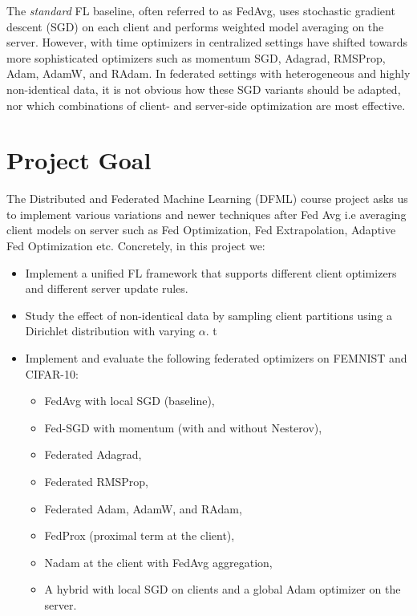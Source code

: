 \documentclass[10pt,twocolumn,letterpaper]{article}
\begin{document}
    The \emph{standard} FL baseline, often referred to as FedAvg, uses
    stochastic gradient descent (SGD) on each client and performs weighted
    model averaging on the server.
    However, with time optimizers in centralized settings have shifted
    towards more sophisticated optimizers such as momentum SGD, Adagrad,
    RMSProp, Adam, AdamW, and RAdam. In federated settings with heterogeneous and highly non-identical data, it is not obvious how these SGD variants should be adapted, nor which combinations of client- and server-side optimization are most effective.

    \section{Project Goal}
    The Distributed and Federated Machine Learning (DFML) course project
    asks us to implement various variations and newer techniques after Fed Avg i.e averaging client models on server such as Fed Optimization, Fed Extrapolation,  Adaptive Fed Optimization etc.
    Concretely, in this project we:
    \begin{itemize}
        \item Implement a unified FL framework that supports different
        client optimizers and different server update rules.
        \item Study the effect of non-identical data by sampling client
        partitions using a Dirichlet distribution with varying $\alpha$.
t        \item Implement and evaluate the following federated optimizers on
        FEMNIST and CIFAR-10:
        \begin{itemize}
            \item FedAvg with local SGD (baseline),
            \item Fed-SGD with momentum (with and without Nesterov),
            \item Federated Adagrad,
            \item Federated RMSProp,
            \item Federated Adam, AdamW, and RAdam,
            \item FedProx (proximal term at the client),
            \item Nadam at the client with FedAvg aggregation,
            \item A hybrid with local SGD on clients and a global Adam
            optimizer on the server.
        \end{itemize}
    \end{itemize}
\end{document}
